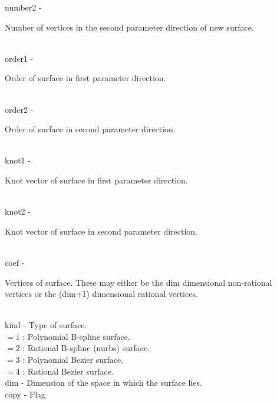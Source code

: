         \>\>    {\fov number}2  \> - \> \begin{minipg2}
                        Number of vertices in the second parameter direction
                        of new surface.
                                \end{minipg2}\\[0.8ex]
        \>\>    {\fov order1     } \> - \>\begin{minipg2}
                        Order of surface in first parameter direction.
                                \end{minipg2}\\
        \>\>    {\fov order2     } \> - \> \begin{minipg2}
                        Order of surface in second parameter direction.
                                \end{minipg2}\\
        \>\>    {\fov knot1    } \> - \> \begin{minipg2}
                        Knot vector of surface in first parameter direction.
                                \end{minipg2}\\
        \>\>    {\fov knot2    } \> - \> \begin{minipg2}
                        Knot vector of surface in second parameter direction.
                                \end{minipg2}\\[0.8ex]
        \>\>    {\fov coef }    \> - \> \begin{minipg2}
Vertices of surface. These may either be the {\fov dim} dimensional non-rational vertices or the {\fov (dim+1)} dimensional rational vertices.
                                \end{minipg2}\\[0.8ex]
        \>\>    {\fov kind  } \> - \> Type of surface.\\
        \>\>\>\>\>       $= 1$ :\> Polynomial B-spline surface.\\
        \>\>\>\>\>       $= 2$ :\> Rational B-spline (nurbs) surface.\\
        \>\>\>\>\>       $= 3$ :\> Polynomial Bezier surface.\\
        \>\>\>\>\>       $= 4$ :\> Rational Bezier surface.\\
        \>\>    {\fov dim   } \> - \> Dimension of the space in which the surface lies.\\
        \>\>    {\fov copy  } \> - \> Flag \\
